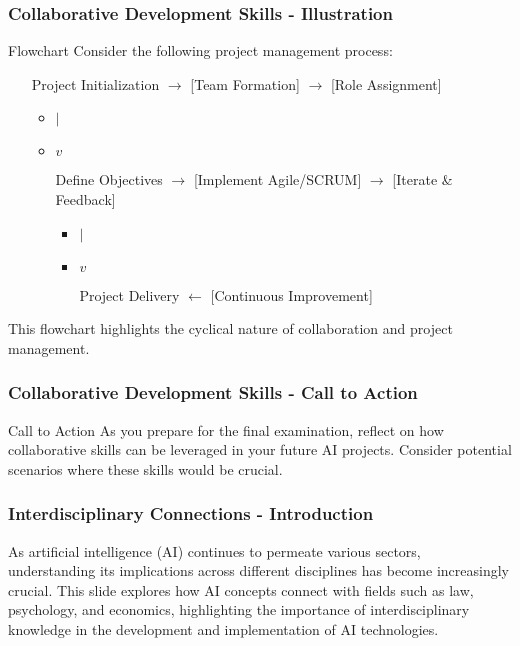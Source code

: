 \documentclass[aspectratio=169]{beamer}
\begin{document}
\begin{frame}[fragile]
    \frametitle{Collaborative Development Skills - Illustration}
    \begin{block}{Flowchart}
        Consider the following project management process:
        
        \begin{itemize}
            \item [Project Initialization] $\rightarrow$ [Team Formation] $\rightarrow$ [Role Assignment]
            \begin{itemize}
                \item $|$
                \item $v$
                \item [Define Objectives] $\rightarrow$ [Implement Agile/SCRUM] $\rightarrow$ [Iterate \& Feedback]
                \begin{itemize}
                    \item $|$
                    \item $v$
                    \item [Project Delivery] $\leftarrow$ [Continuous Improvement]
                \end{itemize}
            \end{itemize}
        \end{itemize}
        
        This flowchart highlights the cyclical nature of collaboration and project management.
    \end{block}
\end{frame}

\begin{frame}[fragile]
    \frametitle{Collaborative Development Skills - Call to Action}
    \begin{block}{Call to Action}
        As you prepare for the final examination, reflect on how collaborative skills can be leveraged in your future AI projects. 
        Consider potential scenarios where these skills would be crucial.
    \end{block}
\end{frame}

\begin{frame}[fragile]
    \frametitle{Interdisciplinary Connections - Introduction}
    As artificial intelligence (AI) continues to permeate various sectors, understanding its implications across different disciplines has become increasingly crucial. 
    This slide explores how AI concepts connect with fields such as law, psychology, and economics, highlighting the importance of interdisciplinary knowledge in the development and implementation of AI technologies.
\end{frame}
\end{document}
